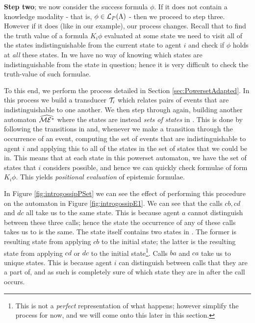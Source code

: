 \documentclass[10pt, a4paper]{report}
\begin{document}
\textbf{Step two}; we now consider the success formula $\phi$. If it does not
contain a knowledge modality - that is, $\phi \in \mathcal{L}_P(\Lambda)$ - then we
proceed to step three. However if it does (like in our example), our process
changes. Recall that to find the truth value of a formula $K_i \phi$ evaluated at
some state we need to visit all of the states indistinguishable from the current
state to agent $i$ and check if $\phi$ holds at \emph{all} these states. In
\mestar we have no way of knowing which states are indistinguishable from the
state in question; hence it is very difficult to check the truth-value of such
formulae.

To this end, we perform the process detailed in Section
\ref{sec:PowersetAdapted}. In this process we build a transducer $\mathcal{T}_i$
which relates pairs of events that are indistinguishable to one another. We then
step through \mestar again, building another automaton $\widehat{\mathcal{ME^\ast}}$ where
the states are instead \emph{sets of states} in \mestar. This is done by
following the transitions in \mestar and, whenever we make a transition through
the occurrence of an event, computing the set of events that are
indistinguishable to agent $i$ and applying this to all of the states in the set
of states that we could be in. This means that at each state in this powerset
automaton, we have the set of states that $i$ considers possible, and hence we
can quickly check formulae of form $K_i \phi$. This yields \emph{positional
  evaluation} of epistemic formulae.

In Figure \ref{fig:introgossipPSet} we can see the effect of performing this
procedure on the automaton in Figure \ref{fig:introgossipE1}. We can see that the
calls $cb, cd$ and $dc$ all take us to the same state. This is because agent $a$
cannot distinguish between these three calls; hence the state the occurrence of
any of these calls takes us to is the same. The state itself contains two states
in \mestar. The former is resulting state from applying $cb$ to the initial
state; the latter is the resulting state from applying $cd$ or $dc$ to the
initial state\footnote{This is not a \emph{perfect} representation of
  what happens; however simplify the process for now, and we will come onto this
  later in this section.}. Calls $ba$ and $ca$ take us to unique states. This is
because agent $i$ can distinguish between calls that they are a part of, and as
such is completely sure of which state they are in after the call occurs.
\end{document}
